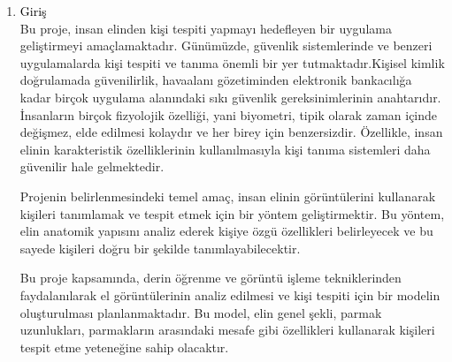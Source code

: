 \documentclass[11pt, a4paper]{article}
\begin{document}
\begin{enumerate}
    \item {\Large\textcolor{black}{Giriş}}
	\\Bu proje, insan elinden kişi tespiti yapmayı hedefleyen bir uygulama geliştirmeyi amaçlamaktadır. Günümüzde, güvenlik sistemlerinde ve benzeri uygulamalarda kişi tespiti ve tanıma önemli bir yer tutmaktadır.Kişisel kimlik doğrulamada güvenilirlik, havaalanı gözetiminden elektronik bankacılığa kadar birçok uygulama alanındaki sıkı güvenlik gereksinimlerinin anahtarıdır. İnsanların birçok fizyolojik özelliği, yani biyometri, tipik olarak zaman içinde değişmez, elde edilmesi kolaydır ve her birey için benzersizdir.\cite{kumar2006personal} Özellikle, insan elinin karakteristik özelliklerinin kullanılmasıyla kişi tanıma sistemleri daha güvenilir hale gelmektedir.
	
	Projenin belirlenmesindeki temel amaç, insan elinin görüntülerini kullanarak kişileri tanımlamak ve tespit etmek için bir yöntem geliştirmektir.\cite{shu1998automated} Bu yöntem, elin anatomik yapısını analiz ederek kişiye özgü özellikleri belirleyecek ve bu sayede kişileri doğru bir şekilde tanımlayabilecektir.
	
	Bu proje kapsamında, derin öğrenme ve görüntü işleme tekniklerinden faydalanılarak el görüntülerinin analiz edilmesi ve kişi tespiti için bir modelin oluşturulması planlanmaktadır. Bu model, elin genel şekli, parmak uzunlukları, parmakların arasındaki mesafe gibi özellikleri kullanarak kişileri tespit etme yeteneğine sahip olacaktır.\\
	

\end{enumerate}
\end{document}
